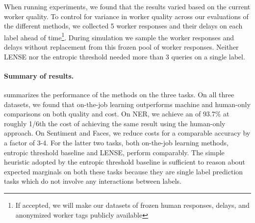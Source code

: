 When running experiments, we found that the results varied based on the current worker quality. %
To control for variance in worker quality across our evaluations of the different methods, we collected 5 worker responses and their delays on each label ahead of time\footnote{If accepted, we will make our datasets of frozen human responses, delays, and anonymized worker tags publicly available}.
During simulation we sample the worker responses and delays without replacement from this frozen pool of worker responses. 
Neither LENSE nor the entropic threshold needed more than 3 queries on a single label.

%
%

\paragraph{Summary of results.}
 summarizes the performance of the methods on the three tasks.
On all three datasets, we found that on-the-job learning outperforms machine and human-only comparisons on both quality and cost. 
On NER, we achieve an \fone{} of $93.7\%$ at roughly 1/6th the cost of achieving the same result using the human-only approach. On Sentiment and Faces, we reduce costs for a comparable accuracy by a factor of 3-4.
For the latter two tasks, both on-the-job learning methods, entropic threshold baseline and LENSE, perform comparably.
The simple heuristic adopted by the entropic threshold baseline is sufficient to reason about expected marginals on both these tasks because they are single label prediction tasks which do not involve any interactions between labels.

